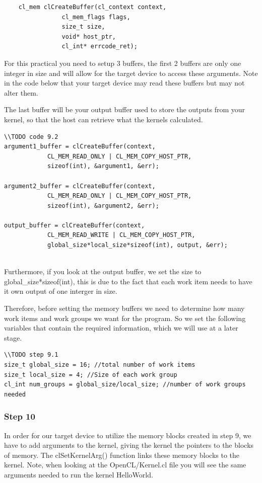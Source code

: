\begin{lstlisting}
	cl_mem clCreateBuffer(cl_context context,
				cl_mem_flags flags,
				size_t size,
				void* host_ptr,
				cl_int* errcode_ret);
\end{lstlisting}

For this practical you need to setup 3 buffers, the first 2 buffers are only one integer in size and will allow for the target device to access these arguments. Note in the code below that your target device may read these buffers but may not alter them.

The last buffer will be your output buffer used to store the outputs from your kernel, so that the host can retrieve what the kernels calculated.

\begin{lstlisting}
\\TODO code 9.2
argument1_buffer = clCreateBuffer(context, 
            CL_MEM_READ_ONLY | CL_MEM_COPY_HOST_PTR, 
            sizeof(int), &argument1, &err);

argument2_buffer = clCreateBuffer(context, 
            CL_MEM_READ_ONLY | CL_MEM_COPY_HOST_PTR, 
            sizeof(int), &argument2, &err);
	
output_buffer = clCreateBuffer(context, 
            CL_MEM_READ_WRITE | CL_MEM_COPY_HOST_PTR, 
            global_size*local_size*sizeof(int), output, &err);
  
\end{lstlisting}

Furthermore, if you look at the output buffer, we set the size to global\_size*sizeof(int), this is due to the fact that each work item needs to have it own output of one interger in size. 

Therefore, before setting the memory buffers we need to determine how many work items and work groups we want for the program. So we set the following variables that contain the required information, which we will use at a later stage.

\begin{lstlisting}
\\TODO step 9.1
size_t global_size = 16; //total number of work items
size_t local_size = 4; //Size of each work group
cl_int num_groups = global_size/local_size; //number of work groups needed
\end{lstlisting}

\subsubsection{Step 10}
In order for our target device to utilize the memory blocks created in step 9, we have to add arguments to the kernel, giving the kernel the pointers to the blocks of memory. The clSetKernelArg() function links these memory blocks to the kernel. Note, when looking at the OpenCL/Kernel.cl file you will see the same arguments needed to run the kernel HelloWorld.

